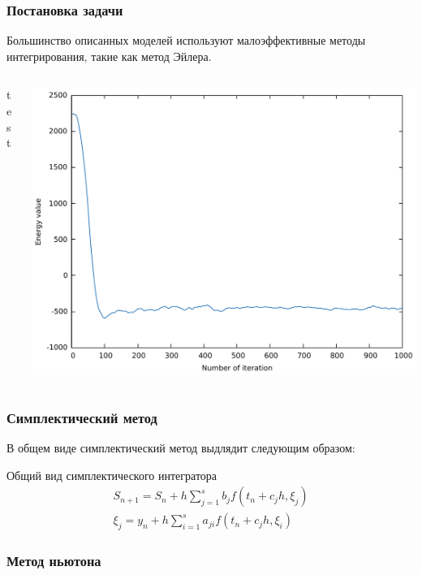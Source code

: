 \documentclass[t]{beamer}
\begin{document}
\begin{frame}
    \frametitle{Постановка задачи}

    Большинство описанных моделей используют малоэффективные методы
    интегрирования, такие как метод Эйлера.


    \begin{columns}
        \begin{column}{0.3\textwidth}
            test
        \end{column}
        \begin{column}{0.7\textwidth}
            \centering
            \includegraphics[scale=0.3]{energy_loss_euler_1}
        \end{column}
    \end{columns}

\end{frame}

\begin{frame}
    \frametitle{Симплектический метод}
    В общем виде симплектический метод выдлядит следующим образом:

    \begin{block}{Общий вид симплектического интегратора}
        \begin{gather*}
            S_{n+1} = S_n + h\sum_{j=1}^s b_j f(t_n+c_jh, \xi_j)
            \\
            \xi_j = y_n + h\sum_{i=1}^{s}a_{ji} f(t_n+c_jh, \xi_i)
        \end{gather*}
    \end{block}
\end{frame}

\begin{frame}
    \frametitle{Метод ньютона}

\end{frame}
\end{document}
